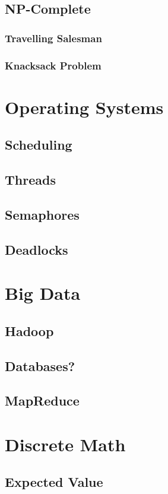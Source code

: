 \documentclass{article}
\begin{document}
	\subsection{NP-Complete}
		\subsubsection{Travelling Salesman}
		\subsubsection{Knacksack Problem}
\clearpage
\section{Operating Systems}
	\subsection{Scheduling}
	\subsection{Threads}
	\subsection{Semaphores}
	\subsection{Deadlocks}
\clearpage
\section{Big Data}
	\subsection{Hadoop}
	\subsection{Databases?}
	\subsection{MapReduce}
\clearpage
\section{Discrete Math}
	\subsection{Expected Value}
\end{document}
